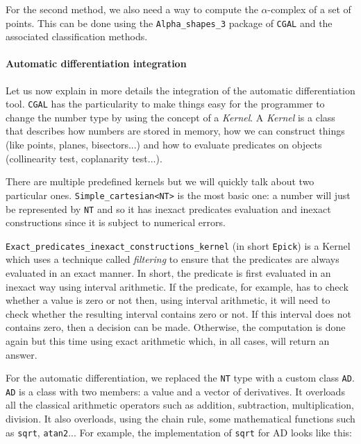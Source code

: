 For the second method, we also need a way to compute the $\alpha$-complex of a
set of points. This can be done using the \texttt{Alpha\_shapes\_3} package of
\texttt{CGAL} and the associated classification methods.

\paragraph{Automatic differentiation integration}

Let us now explain in more details the integration of the automatic
differentiation tool. \texttt{CGAL} has the particularity to make things easy
for the programmer to change the number type by using the concept of a
\emph{Kernel}. A \emph{Kernel} is a class that describes how numbers are stored
in memory, how we can construct things (like points, planes, bisectors...) and
how to evaluate predicates on objects (collinearity test, coplanarity test...).

There are multiple predefined kernels but we will quickly talk about two
particular ones. \texttt{Simple\_cartesian<NT>} is the most basic one: a number
will just be represented by \texttt{NT} and so it has inexact predicates
evaluation and inexact constructions since it is subject to numerical errors.

\texttt{Exact\_predicates\_inexact\_constructions\_kernel} (in short
\texttt{Epick}) is a Kernel which uses a technique called \emph{filtering} to
ensure that the predicates are always evaluated in an exact manner. In short,
the predicate is first evaluated in an inexact way using interval arithmetic.
If the predicate, for example, has to check whether a value is zero or not then,
using interval arithmetic, it will need to check whether the resulting interval
contains zero or not. If this interval does not contains zero, then a decision
can be made. Otherwise, the computation is done again but this time using exact
arithmetic which, in all cases, will return an answer.

For the automatic differentiation, we replaced the \texttt{NT} type with a
custom class \texttt{AD}. \texttt{AD} is a class with two members: a value and a
vector of derivatives. It overloads all the classical arithmetic operators such
as addition, subtraction, multiplication, division. It also overloads, using the
chain rule, some mathematical functions such as \texttt{sqrt}, \texttt{atan2}...
For example, the implementation of \texttt{sqrt} for AD looks like this:


